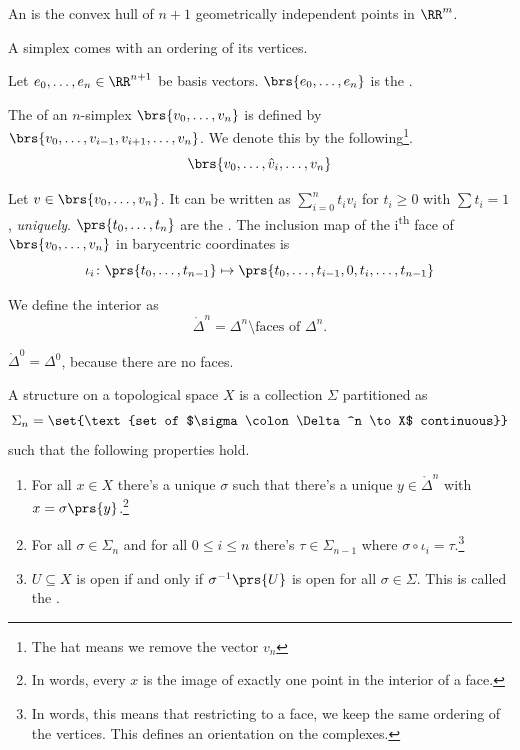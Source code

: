 \documentclass[10pt,a4paper,twoside,openany,hidelinks]{book}
\begin{document}
\begin{definition}
An  is the convex hull of $n+1$ geometrically independent points in $\RR^m$.
\end{definition}
\begin{remark}
A simplex comes with an ordering of its vertices.
\end{remark}
\begin{definition}
Let $e_0, \ldots, e_n \in \RR^{n+1}$ be basis vectors.
$\brs{e_0, \ldots, e_n}$ is the .
\end{definition}
\begin{definition}
The  of an $n$-simplex $\brs{v_0, \ldots, v_n}$ is defined by $\brs{v_0, \ldots, v_{i-1}, v_{i+1}, \ldots, v_n}$. We denote this by the following\footnote{The hat means we remove the vector $v_n$}. \[\brs{v_0, \ldots, \hat{v}_i, \ldots, v_n}\] 
\end{definition}
\begin{definition}
Let $v \in \brs{v_0, \ldots, v_n}$. It can be written as $\sum_{i=0}^n t_i v_i$ for $t_i \geq 0$ with $\sum t_i = 1$, \emph{uniquely}. $\prs{t_0, \ldots, t_n}$ are the .
The inclusion map of the i\textsuperscript{th} face of $\brs{v_0, \ldots, v_n}$ in barycentric coordinates is
\[\iota_i \colon \prs{t_0, \ldots, t_{n-1}} \mapsto \prs{t_0, \ldots, t_{i-1}, 0, t_i, \ldots, t_{n-1}}\]
\end{definition}
\begin{definition}
We define the interior as \[\mathring{\Delta}^n = \Delta^n \setminus \text{faces of $\Delta^n$}\text{.}\]
\end{definition}
\begin{remark}
$\mathring{\Delta}^0 = \Delta^0$, because there are no faces.
\end{remark}
\begin{definition}
A  structure on a topological space $X$ is a collection $\Sigma$ partitioned as \[\Sigma_n = \set{\text{set of $\sigma \colon \Delta^n \to X$ continuous}}\] such that the following properties hold.
\begin{enumerate}
\item For all $x\in X$ there's a unique $\sigma$ such that there's a unique $y \in \mathring{\Delta}^n$ with $x = \sigma\prs{y}$.\footnote{In words, every $x$ is the image of exactly one point in the interior of a face.}

\item For all $\sigma \in \Sigma_n$ and for all $0 \leq i \leq n$ there's $\tau \in \Sigma_{n-1}$ where $\sigma \circ \iota_i = \tau$.\footnote{In words, this means that restricting to a face, we keep the same ordering of the vertices. This defines an orientation on the complexes.}

\item $U \subseteq X$ is open if and only if $\sigma^{-1}\prs{U}$ is open for all $\sigma \in \Sigma$. This is called the .
\end{enumerate}
\end{definition}
\end{document}
